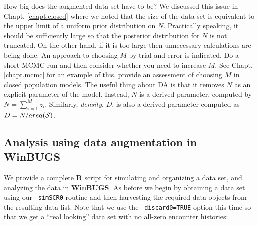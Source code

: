 How big does the augmented data set have to be? We discussed this
issue in Chapt. \ref{chapt.closed} where we noted that the size of the
data set is equivalent to the upper limit of a uniform prior
distribution on $N$.  Practically speaking, it should be sufficiently
large so that the posterior distribution for $N$ is not truncated. On
the other hand, if it is too large then unnecessary calculations are
being done. An approach to choosing $M$ by trial-and-error is
indicated. 
Do a short MCMC run and then consider
whether you need to increase $M$. See Chapt. \ref{chapt.mcmc} for an
example of this. \citet[][ch. 6]{kery_schaub:2011} provide an
assessment of choosing $M$ in closed population models.
The useful thing about DA
is that it removes $N$ as an explicit parameter of
the model. Instead, $N$ is a derived parameter, computed by $N=
\sum_{i=1}^{M} z_{i}$. Similarly, {\it density}, $D$, is also a
derived parameter computed as $D=N/area({\cal S})$. 

\subsection{Analysis using data augmentation in WinBUGS}

We provide a complete {\bf R} script for simulating and organizing a
data set, and analyzing the data in {\bf WinBUGS}.
As before we begin by obtaining a data set using our \mbox{\tt
  simSCR0} routine and then harvesting the required data objects
from the resulting data list.  Note that we use the \mbox{\tt
  discard0=TRUE} option this time so that we get a ``real looking'' data set
with no all-zero encounter histories:

